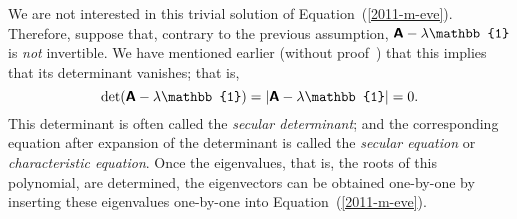 We are not interested in this trivial solution of Equation~(\ref{2011-m-eve}).
Therefore, suppose that, contrary to the previous assumption,
$\textsf{\textbf{A}} - \lambda \mathbb{1}$ is {\em not} invertible.
We have mentioned earlier (without proof~\cite{Sanderson-3Blue1Brown-LA7}) that this implies that its determinant vanishes; that is,
\begin{equation}
\textrm{det} (\textsf{\textbf{A}} - \lambda \mathbb{1}) = \vert \textsf{\textbf{A}} - \lambda \mathbb{1}\vert =0.
\label{2014-m-eve-ce}
\end{equation}
This determinant is often called the {\em secular determinant};
and the corresponding equation after expansion of the determinant is called the
{\em secular equation}
or {\em characteristic equation}.
Once the eigenvalues, that is, the roots of this polynomial, are determined,
the eigenvectors can be obtained one-by-one by inserting these eigenvalues one-by-one into Equation~(\ref{2011-m-eve}).


